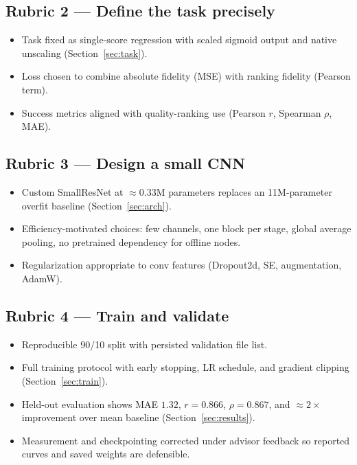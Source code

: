 \documentclass[12pt, letterpaper, titlepage]{article}
\begin{document}
\subsection{Rubric 2 --- Define the task precisely}

\begin{itemize}[leftmargin=*]
    \item Task fixed as single-score regression with scaled sigmoid output and native unscaling (Section~\ref{sec:task}).
    \item Loss chosen to combine absolute fidelity (MSE) with ranking fidelity (Pearson term).
    \item Success metrics aligned with quality-ranking use (Pearson $r$, Spearman $\rho$, MAE).
\end{itemize}

\subsection{Rubric 3 --- Design a small CNN}

\begin{itemize}[leftmargin=*]
    \item Custom SmallResNet at $\approx 0.33$M parameters replaces an 11M-parameter overfit baseline (Section~\ref{sec:arch}).
    \item Efficiency-motivated choices: few channels, one block per stage, global average pooling, no pretrained dependency for offline nodes.
    \item Regularization appropriate to conv features (Dropout2d, SE, augmentation, AdamW).
\end{itemize}

\subsection{Rubric 4 --- Train and validate}

\begin{itemize}[leftmargin=*]
    \item Reproducible 90/10 split with persisted validation file list.
    \item Full training protocol with early stopping, LR schedule, and gradient clipping (Section~\ref{sec:train}).
    \item Held-out evaluation shows MAE $1.32$, $r=0.866$, $\rho=0.867$, and $\approx 2\times$ improvement over mean baseline (Section~\ref{sec:results}).
    \item Measurement and checkpointing corrected under advisor feedback so reported curves and saved weights are defensible.
\end{itemize}
\end{document}
